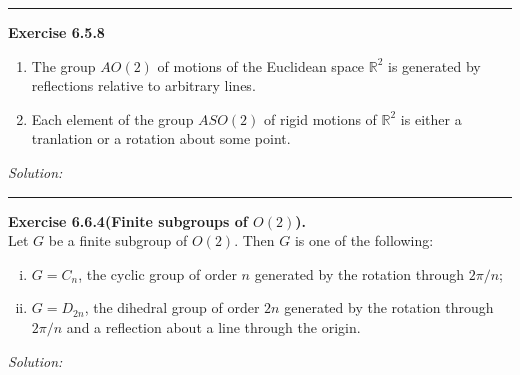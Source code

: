 \documentclass[a4paper, 12pt]{article}
\newenvironment{problem}[2][Exercise]
    { \begin{mdframed}[backgroundcolor=gray!20] \textbf{#1 #2} \\}
    {  \end{mdframed}}
\newenvironment{solution}
    {\textit{Solution:}}
    {}
\begin{document}
\noindent\rule{7in}{2.8pt}

\begin{problem}{6.5.8}
\begin{enumerate}[(1)]
\item The group \(AO(2)\) of motions of the Euclidean space \(\mathbb{R}^2\) is generated by reflections relative to arbitrary lines.
\item Each element of the group \(ASO(2)\) of rigid motions of \(\mathbb{R}^2\) is either a tranlation or a rotation about some point.
\end{enumerate}
\end{problem}
\begin{solution}
    
\end{solution}

\noindent\rule{7in}{2.8pt}
\begin{problem}{6.6.4(Finite subgroups of \(O(2)\)).}
Let \(G\) be a finite subgroup of \(O(2)\). Then \(G\) is one of the following:
\begin{enumerate}[(i)]
\item \(G=C_n\), the cyclic group of order \(n\) generated by the rotation through \(2\pi/n\);
\item \(G=D_{2n}\), the dihedral group of order \(2n\) generated by the rotation through \(2\pi/n\) and a reflection about a line through the origin.
\end{enumerate}
\end{problem}
\begin{solution}
    
\end{solution}
\end{document}
